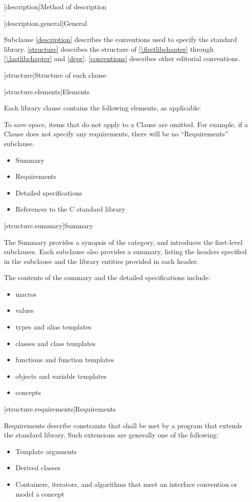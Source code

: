 [description]{Method of description}

[description.general]{General}

\pnum
Subclause \ref{description} describes the conventions used to specify the \Cpp{} standard
library. \ref{structure} describes the structure of
\ref{\firstlibchapter} through \ref{\lastlibchapter} and
\ref{depr}. \ref{conventions} describes other editorial conventions.

[structure]{Structure of each clause}

[structure.elements]{Elements}

\pnum
Each library clause contains the following elements, as applicable:
\begin{footnote}
To
save space, items that do not apply to a Clause are omitted.
For example, if a Clause does not specify any requirements,
there will be no ``Requirements'' subclause.
\end{footnote}
\begin{itemize}
\item Summary
\item Requirements
\item Detailed specifications
\item References to the C standard library
\end{itemize}

[structure.summary]{Summary}

\pnum
The Summary provides a synopsis of the category, and introduces the first-level subclauses.
Each subclause also provides a summary, listing the headers specified in the
subclause and the library entities provided in each header.

\pnum
The contents of the summary and the detailed specifications include:
\begin{itemize}
\item macros
\item values
\item types and alias templates
\item classes and class templates
\item functions and function templates
\item objects and variable templates
\item concepts
\end{itemize}

[structure.requirements]{Requirements}

\pnum
{}%
Requirements describe constraints that shall be met by a \Cpp{} program that extends the standard library.
Such extensions are generally one of the following:
\begin{itemize}
\item Template arguments
\item Derived classes
\item Containers, iterators, and algorithms that meet an interface convention or
  model a concept
\end{itemize}

